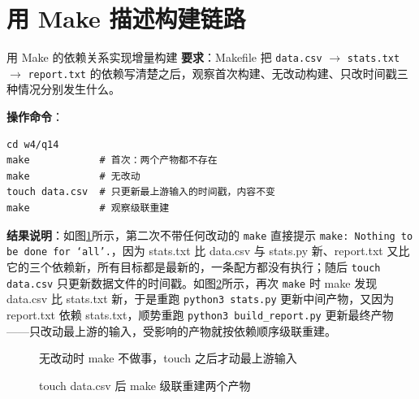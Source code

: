 \section{用 Make 描述构建链路}

\begin{exercise}{用 Make 的依赖关系实现增量构建}
\textbf{要求}：Makefile 把 \verb|data.csv| $\rightarrow$ \verb|stats.txt| $\rightarrow$ \verb|report.txt| 的依赖写清楚之后，观察首次构建、无改动构建、只改时间戳三种情况分别发生什么。

\textbf{操作命令}：
\begin{lstlisting}
cd w4/q14
make            # 首次：两个产物都不存在
make            # 无改动
touch data.csv  # 只更新最上游输入的时间戳，内容不变
make            # 观察级联重建
\end{lstlisting}

\textbf{结果说明}：如图\ref{fig:ms4-06a}所示，第二次不带任何改动的 \verb|make| 直接提示 \texttt{make: Nothing to be done for `all'.}，因为 stats.txt 比 data.csv 与 stats.py 新、report.txt 又比它的三个依赖新，所有目标都是最新的，一条配方都没有执行；随后 \verb|touch data.csv| 只更新数据文件的时间戳。如图\ref{fig:ms4-06b}所示，再次 \verb|make| 时 make 发现 data.csv 比 stats.txt 新，于是重跑 \verb|python3 stats.py| 更新中间产物，又因为 report.txt 依赖 stats.txt，顺势重跑 \verb|python3 build_report.py| 更新最终产物——只改动最上游的输入，受影响的产物就按依赖顺序级联重建。

\begin{figure}[H]
    \centering
    \caption{无改动时 make 不做事，touch 之后才动最上游输入}
    \label{fig:ms4-06a}
\end{figure}

\begin{figure}[H]
    \centering
    \caption{touch data.csv 后 make 级联重建两个产物}
    \label{fig:ms4-06b}
\end{figure}
\end{exercise}

